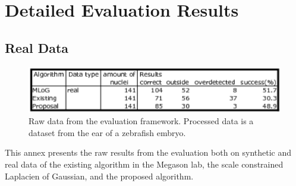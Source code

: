 




\chapter{Detailed Evaluation Results}
\label{annex:Eval}

\section{Real Data}
\begin{figure}[H]
  \centering
  \includegraphics[width=1\textwidth]{pictures/evalReal}          
  \caption{Raw data from the evaluation framework. Processed data is a dataset from the ear of a zebrafish embryo.}
  \label{tab:realEvalRaw}
\end{figure}

This annex presents the raw results from the evaluation both on synthetic and real data of the existing algorithm in the Megason lab, the scale constrained Laplacien of Gaussian, and the proposed algorithm.
